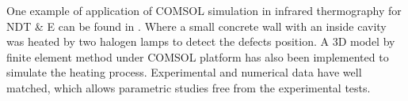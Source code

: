 One example of application of COMSOL simulation in infrared thermography for NDT \& E can be found in \citep{Cannas2012Modeling}. Where a small concrete wall with an inside cavity was heated by two halogen lamps to detect the defects position. A 3D model by finite element method under COMSOL platform has also been implemented to simulate the heating process. Experimental and numerical data have well matched, which allows parametric studies free from the experimental tests.

% 